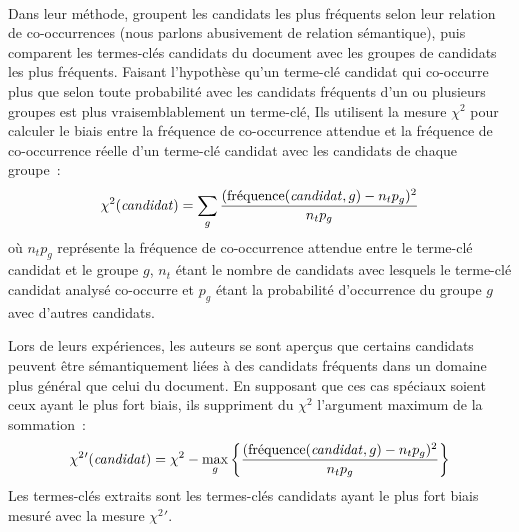         ~\\Dans leur méthode,  groupent les
        candidats les plus fréquents selon leur relation de co-occurrences (nous
        parlons abusivement de relation sémantique), puis comparent les
        termes-clés candidats du document avec les groupes de candidats les plus
        fréquents. Faisant l'hypothèse qu'un terme-clé candidat qui co-occurre
        plus que selon toute probabilité avec les candidats fréquents d'un ou
        plusieurs groupes est plus vraisemblablement un terme-clé, Ils utilisent
        la mesure $\chi^2$ pour calculer le biais entre la fréquence de
        co-occurrence attendue et la fréquence de co-occurrence réelle d'un
        terme-clé candidat avec les candidats de chaque groupe~:
        \begin{align}
          \chi^2(\text{\textit{candidat}}) = \sum_{g} \frac{(\text{fréquence}(\text{\textit{candidat}}, g) - n_tp_g)^2}{n_tp_g}
        \end{align}
        où $n_tp_g$ représente la fréquence de co-occurrence attendue entre le
        terme-clé candidat et le groupe $g$, $n_t$ étant le nombre de candidats
        avec lesquels le terme-clé candidat analysé co-occurre et $p_g$ étant la
        probabilité d'occurrence du groupe $g$ avec d'autres candidats.
        
        Lors de leurs expériences, les auteurs se sont aperçus que certains
        candidats peuvent être sémantiquement liées à des candidats fréquents
        dans un domaine plus général que celui du document. En supposant que ces
        cas spéciaux soient ceux ayant le plus fort biais, ils suppriment du
        $\chi^2$ l'argument maximum de la sommation~:
        \begin{align}
          \chi^2{'}(\text{\textit{candidat}}) = \chi^2 - \max_{g}\left\{\frac{(\text{fréquence}(\text{\textit{candidat}}, g) - n_tp_g)^2}{n_tp_g}\right\}
        \end{align}
        Les termes-clés extraits sont les termes-clés candidats ayant le plus
        fort biais mesuré avec la mesure $\chi^2{'}$.

